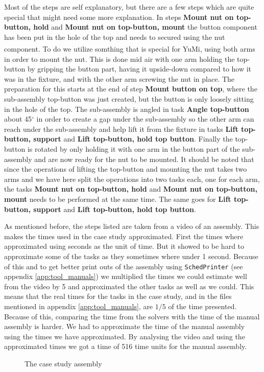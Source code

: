 \noindent Most of the steps are self explanatory, but there are a few steps which are quite special that might need some more explanation. In steps \textbf{Mount nut on top-button, hold} and \textbf{Mount nut on top-button, mount} the button component has been put in the hole of the top and needs to secured using the nut component. To do we utilize somthing that is special for YuMi\textsuperscript\textregistered, using both arms in order to mount the nut. This is done mid air with one arm holding the top-button by gripping the button part, having it upside-down compared to how it was in the fixture, and with the other arm screwing the nut in place. The preparation for this starts at the end of step \textbf{Mount button on top}, where the sub-assembly top-button was just created, but the button is only loosely sitting in the hole of the top. The sub-assembly is angled in task \textbf{Angle top-button} about 45$^\circ$ in order to create a gap under the sub-assembly so the other arm can reach under the sub-assembly and help lift it from the fixture in tasks \textbf{Lift top-button, support} and \textbf{Lift top-button, hold top button}. Finally the top-button is rotated by only holding it with one arm in the button part of the sub-assembly and are now ready for the nut to be mounted.
It should be noted that since the operations of lifting the top-button and mounting the nut takes two arms and we have here split the operations into two tasks each, one for each arm, the tasks \textbf{Mount nut on top-button, hold} and \textbf{Mount nut on top-button, mount} needs to be performed at the same time. The same goes for  \textbf{Lift top-button, support} and \textbf{Lift top-button, hold top button}.

As mentioned before, the steps listed are taken from a video of an assembly. This makes the times used in the case study approximated. First the times where approximated using seconds as the unit of time. But it showed to be hard to approximate some of the tasks as they sometimes where under 1 second. Because of this and to get better print outs of the assembly using \texttt{SchedPrinter} (see appendix \ref{app:tool_manuals}) we multiplied the times we could estimate well from the video by 5 and approximated the other tasks as well as we could. This means that the real times for the tasks in the case study, and in the files mentioned in appendix \ref{app:tool_manuals}, are $1/5$ of the time presented. Because of this, comparing the time from the solvers with the time of the manual assembly is harder. We had to approximate the time of the manual assembly using the times we have approximated. By analysing the video and using the approximated times we got a time of 516 time units for the manual assembly.

\begin{landscape}
\begin{figure}

\caption{The case study assembly}
\label{fig:assembly}
\end{figure}
\end{landscape}

%